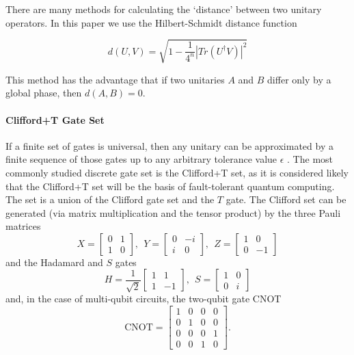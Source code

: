 \documentclass[letterpaper]{article} %
\begin{document}
There are many methods for calculating the `distance' between two unitary operators.
In this paper we use the Hilbert-Schmidt distance function

\begin{equation}
	d(U,V) = \sqrt{1 - \frac{1}{4^n} |Tr(U^{\dagger}V)|^2}
\end{equation}

This method has the advantage that if two unitaries $A$ and $B$ differ only by a global phase, then $d(A,B)=0$.


\paragraph{Clifford+T Gate Set}

If a finite set of gates is universal, then any unitary can be approximated by a finite sequence
of those gates up to any arbitrary tolerance value $\epsilon$ \cite{nielsen2010quantum}.
The most commonly studied discrete gate set is the Clifford+T set, as it is considered likely that the Clifford+T
set will be the basis of fault-tolerant quantum computing.
The set is a union of the Clifford gate set and the $T$ gate.
The Clifford set can be generated (via matrix multiplication and the tensor product) by the three Pauli matrices
\begin{equation}
	X =
	\begin{bmatrix}
		0 & 1 \\
		1 & 0
	\end{bmatrix}
	,~~
	Y =
	\begin{bmatrix}
		0 & -i \\
		i & 0
	\end{bmatrix}
	,~~
	Z =
	\begin{bmatrix}
		1 & 0 \\
		0 & -1
	\end{bmatrix}
\end{equation}
and the Hadamard and $S$ gates
\begin{equation}
	H =
	\frac{1}{\sqrt{2}}
	\begin{bmatrix}
		1 & 1 \\
		1 & -1
	\end{bmatrix}
	,~~
	S =
	\begin{bmatrix}
		1 & 0 \\
		0 & i
	\end{bmatrix}
\end{equation}
and, in the case of multi-qubit circuits, the two-qubit gate CNOT
\begin{equation}
	\text{CNOT} =
	\begin{bmatrix}
		1 & 0 & 0 & 0 \\
		0 & 1 & 0 & 0 \\
		0 & 0 & 0 & 1 \\
		0 & 0 & 1 & 0
	\end{bmatrix}.
\end{equation}
\end{document}
